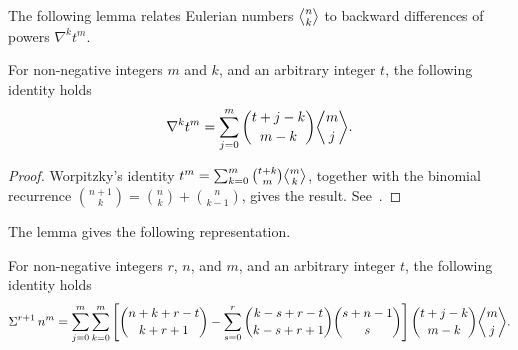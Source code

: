The following lemma relates Eulerian numbers $\eulerian{n}{k}$ to backward
differences of powers $\nabla^{k} t^{m}$.
\begin{lemma} 
  For non-negative integers $m$ and $k$, and an arbitrary integer $t$, the following identity holds
  \label{lem:eulerian-backward-differences}
  \begin{align*}
    \nabla^{k} t^{m} = \sum_{j=0}^{m} \binom{t+j-k}{m-k} \eulerian{m}{j}.
  \end{align*}
  \begin{proof}
    Worpitzky's identity
    $t^{m} = \sum_{k=0}^{m} \binom{t+k}{m} \eulerian{m}{k}$,
    together with the binomial recurrence
    $\binom{n+1}{k} = \binom{n}{k} + \binom{n}{k-1}$,
    gives the result. See~\cite{Worpitzky1883}.
  \end{proof}
\end{lemma}
The lemma gives the following representation.
\begin{proposition} 
  \label{prop:multifold-eulerian-sums-of-powers}
  For non-negative integers $r$, $n$, and $m$, and an arbitrary integer $t$, the following identity holds
  \begin{align*}
    \KnuthRFoldSum{r+1}{n}{m}
    =
    \sum_{j=0}^{m}
    \sum_{k=0}^{m}
    \left[
      \binom{n+k+r-t}{k+r+1}
      -
      \sum_{s=0}^{r}
      \binom{k-s+r-t}{k-s+r+1} \binom{s+n-1}{s}
    \right]
    \binom{t+j-k}{m-k} \eulerian{m}{j}.
  \end{align*}
\end{proposition}
